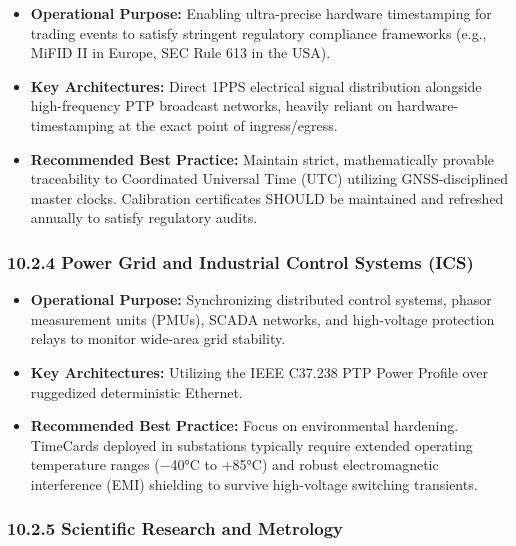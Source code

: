 \documentclass[
]{article}
\begin{document}
\begin{itemize}
\item
  \textbf{Operational Purpose:} Enabling ultra-precise hardware
  timestamping for trading events to satisfy stringent regulatory
  compliance frameworks (e.g., MiFID II in Europe, SEC Rule 613 in the
  USA).
\item
  \textbf{Key Architectures:} Direct 1PPS electrical signal distribution
  alongside high-frequency PTP broadcast networks, heavily reliant on
  hardware-timestamping at the exact point of ingress/egress.
\item
  \textbf{Recommended Best Practice:} Maintain strict, mathematically
  provable traceability to Coordinated Universal Time (UTC) utilizing
  GNSS-disciplined master clocks. Calibration certificates SHOULD be
  maintained and refreshed annually to satisfy regulatory audits.
\end{itemize}

\subsubsection{10.2.4 Power Grid and Industrial Control Systems
(ICS)}\label{power-grid-and-industrial-control-systems-ics}

\begin{itemize}
\item
  \textbf{Operational Purpose:} Synchronizing distributed control
  systems, phasor measurement units (PMUs), SCADA networks, and
  high-voltage protection relays to monitor wide-area grid stability.
\item
  \textbf{Key Architectures:} Utilizing the IEEE C37.238 PTP Power
  Profile over ruggedized deterministic Ethernet.
\item
  \textbf{Recommended Best Practice:} Focus on environmental hardening.
  TimeCards deployed in substations typically require extended operating
  temperature ranges (−40°C to +85°C) and robust electromagnetic
  interference (EMI) shielding to survive high-voltage switching
  transients.
\end{itemize}

\subsubsection{10.2.5 Scientific Research and
Metrology}\label{scientific-research-and-metrology}
\end{document}
